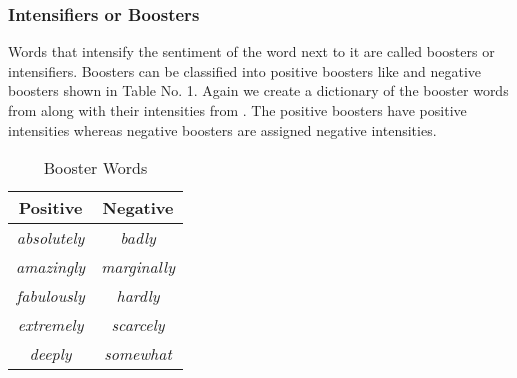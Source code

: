 \documentclass[a4paper, 10pt, conference]{ieeeconf}
\begin{document}
	\subsubsection{Intensifiers or Boosters}
	Words that intensify the sentiment of the word next to it are called boosters or intensifiers. Boosters can be classified into positive boosters like  and negative boosters shown in Table No. 1. Again we create a dictionary of the booster words from \cite{c16} along with their intensities from \cite{c1}. The positive boosters have positive intensities whereas negative boosters are assigned negative intensities.
	\begin{table}[h!]
		\caption{Booster Words}
		\begin{center}
			\begin{tabular}{ |c|c| } 
				
				\hline
				\textbf{Positive} & \textbf{Negative}  \\ 
				\hline
				\textit{absolutely} & \textit{badly}  \\ 
				\hline
				\textit{amazingly} & \textit{marginally}  \\ 
				\hline
				\textit{fabulously} & \textit{hardly}  \\ 
				\hline
				\textit{extremely} & \textit{scarcely}  \\ 
				\hline
				\textit{deeply} & \textit{somewhat}  \\ 
				\hline
			\end{tabular}	
		\end{center}
		
	\end{table}
\end{document}

